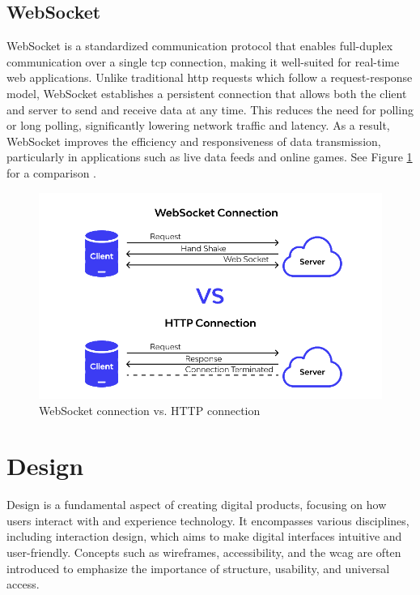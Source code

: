 \subsection*{WebSocket}
\label{subsec:websocket}

WebSocket is a standardized communication protocol that enables full-duplex communication over a single \gls{tcp} connection, making it well-suited for real-time web applications. Unlike traditional \gls{http} requests which follow a request-response model, WebSocket establishes a persistent connection that allows both the client and server to send and receive data at any time. This reduces the need for polling or long polling, significantly lowering network traffic and latency. As a result, WebSocket improves the efficiency and responsiveness of data transmission, particularly in applications such as live data feeds and online games. See Figure \ref{fig:websocket-vs-http} for a comparison \cite{nodejs:websocket, apidog:websocket}.

\begin{figure}[h!]
    \centering
    \includegraphics[width=0.75\linewidth]{figures/theory/websocket-vs-http.png}
    \caption[WebSocket connection vs. HTTP connection]{WebSocket connection vs. HTTP connection \cite{apidog:websocket}}
    \label{fig:websocket-vs-http}
\end{figure}

\section{Design}
\label{sec:design}

Design is a fundamental aspect of creating digital products, focusing on how users interact with and experience technology. It encompasses various disciplines, including interaction design, which aims to make digital interfaces intuitive and user-friendly. Concepts such as wireframes, accessibility, and the \gls{wcag} are often introduced to emphasize the importance of structure, usability, and universal access. \\

